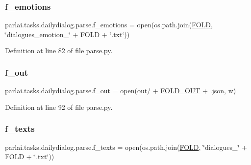\subsubsection{\texorpdfstring{f\+\_\+emotions}{f\_emotions}}
{\footnotesize\ttfamily parlai.\+tasks.\+dailydialog.\+parse.\+f\+\_\+emotions = open(os.\+path.\+join(\hyperlink{namespaceparlai_1_1tasks_1_1dailydialog_1_1parse_a8c9e030332871e8cb356bcb74c0ddc8c}{F\+O\+LD}, \char`\"{}dialogues\+\_\+emotion\+\_\+\char`\"{} + F\+O\+LD + \char`\"{}.txt\char`\"{}))}



Definition at line 82 of file parse.\+py.

\mbox{\label{namespaceparlai_1_1tasks_1_1dailydialog_1_1parse_ab6bfab164fed7ef268d5494379f02aee}} 
\subsubsection{\texorpdfstring{f\+\_\+out}{f\_out}}
{\footnotesize\ttfamily parlai.\+tasks.\+dailydialog.\+parse.\+f\+\_\+out = open(\textquotesingle{}out/\textquotesingle{} + \hyperlink{namespaceparlai_1_1tasks_1_1dailydialog_1_1parse_ae6d3cefc4e18c51bfedecae2c5bc875d}{F\+O\+L\+D\+\_\+\+O\+UT} + \textquotesingle{}.json\textquotesingle{}, \textquotesingle{}w\textquotesingle{})}



Definition at line 92 of file parse.\+py.

\mbox{\label{namespaceparlai_1_1tasks_1_1dailydialog_1_1parse_a47da41fc1bbbd6a59d8fc5c3640f46e8}} 
\subsubsection{\texorpdfstring{f\+\_\+texts}{f\_texts}}
{\footnotesize\ttfamily parlai.\+tasks.\+dailydialog.\+parse.\+f\+\_\+texts = open(os.\+path.\+join(\hyperlink{namespaceparlai_1_1tasks_1_1dailydialog_1_1parse_a8c9e030332871e8cb356bcb74c0ddc8c}{F\+O\+LD}, \char`\"{}dialogues\+\_\+\char`\"{} + F\+O\+LD + \char`\"{}.txt\char`\"{}))}



